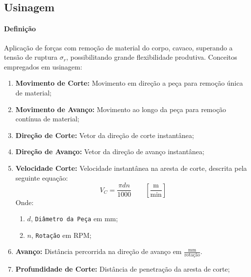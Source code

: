 \documentclass{article}
\begin{document}
        \subsection{Usinagem}
            \paragraph{Definição}Aplicação de forças com remoção de material do corpo, cavaco, superando a tensão de ruptura $\sigma_{r}$, possibilitando grande flexibilidade produtiva. Conceitos empregados em usinagem:
                \begin{enumerate}[rightmargin = \leftmargin]
                    \item \textbf{Movimento de Corte:} Movimento em direção a peça para remoção única de material;

                    \item \textbf{Movimento de Avanço:} Movimento ao longo da peça para remoção contínua de material;

                    \item \textbf{Direção de Corte:} Vetor da direção de corte instantânea;

                    \item \textbf{Direção de Avanço:} Vetor da direção de avanço instantânea;

                    \item \textbf{Velocidade Corte:} Velocidade instantânea na aresta de corte, descrita pela seguinte equação:
                        \begin{equation}
                            \boxed{
                                V_{C} = \frac{\pi d n }{1000}
                                \qquad
                                \left[
                                    \frac{\text{m}}{\text{min}}\right]
                            }
                        \end{equation}
                    Onde:
                        \begin{enumerate}[rightmargin = \leftmargin, noitemsep]
                            \item $d$, \texttt{Diâmetro da Peça} em mm;
                            \item $n$, \texttt{Rotação} em RPM;
                        \end{enumerate}

                    \item \textbf{Avanço:} Distância percorrida na direção de avanço em $\frac{\text{mm}}{\text{rotação}}$.

                    \item \textbf{Profundidade de Corte:} Distância de penetração da aresta de corte;
                \end{enumerate}
\end{document}
